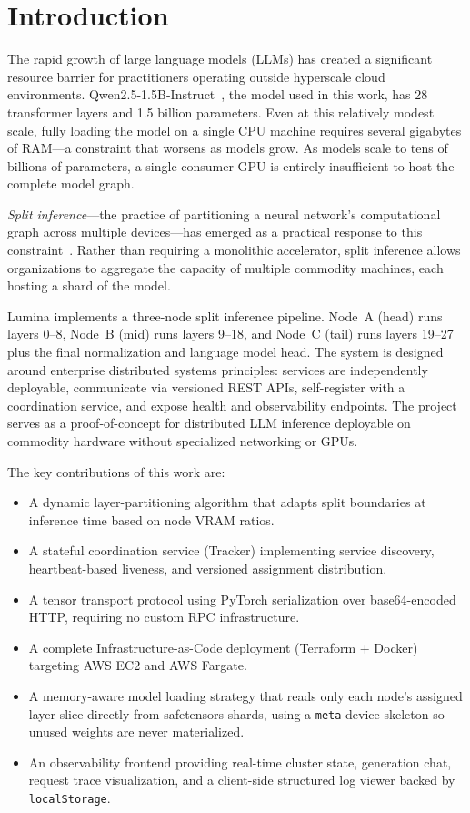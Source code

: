 \documentclass[conference]{IEEEtran}
\begin{document}
\section{Introduction}

The rapid growth of large language models (LLMs) has created a significant
resource barrier for practitioners operating outside hyperscale cloud
environments. Qwen2.5-1.5B-Instruct~\cite{qwen2025}, the model used in this work,
has 28 transformer layers and 1.5 billion parameters. Even at this relatively
modest scale, fully loading the model on a single CPU machine requires several
gigabytes of RAM—a constraint that worsens as models grow. As models scale to
tens of billions of parameters, a single consumer GPU is entirely insufficient
to host the complete model graph.

\emph{Split inference}---the practice of partitioning a neural network's
computational graph across multiple devices---has emerged as a practical
response to this constraint~\cite{kang2017neurosurgeon}. Rather than requiring
a monolithic accelerator, split inference allows organizations to aggregate the
capacity of multiple commodity machines, each hosting a shard of the model.

Lumina implements a three-node split inference pipeline. Node~A (head) runs
layers 0--8, Node~B (mid) runs layers 9--18, and Node~C (tail) runs layers
19--27 plus the final normalization and language model head. The system is
designed around enterprise distributed systems principles: services are
independently deployable, communicate via versioned REST APIs, self-register
with a coordination service, and expose health and observability endpoints.
The project serves as a proof-of-concept for distributed LLM inference
deployable on commodity hardware without specialized networking or GPUs.

The key contributions of this work are:

\begin{itemize}
  \item A dynamic layer-partitioning algorithm that adapts split boundaries at
        inference time based on node VRAM ratios.
  \item A stateful coordination service (Tracker) implementing service
        discovery, heartbeat-based liveness, and versioned assignment
        distribution.
  \item A tensor transport protocol using PyTorch serialization over
        base64-encoded HTTP, requiring no custom RPC infrastructure.
  \item A complete Infrastructure-as-Code deployment (Terraform + Docker)
        targeting AWS EC2 and AWS Fargate.
  \item A memory-aware model loading strategy that reads only each node's
        assigned layer slice directly from safetensors shards, using a
        \texttt{meta}-device skeleton so unused weights are never materialized.
  \item An observability frontend providing real-time cluster state, generation
        chat, request trace visualization, and a client-side structured log
        viewer backed by \texttt{localStorage}.
\end{itemize}
\end{document}
